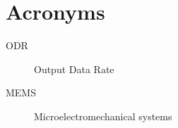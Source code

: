 
\chapter{Acronyms}
\begin{description}
\item[ODR] Output Data Rate
\item[MEMS] Microelectromechanical systems 
\end{description}